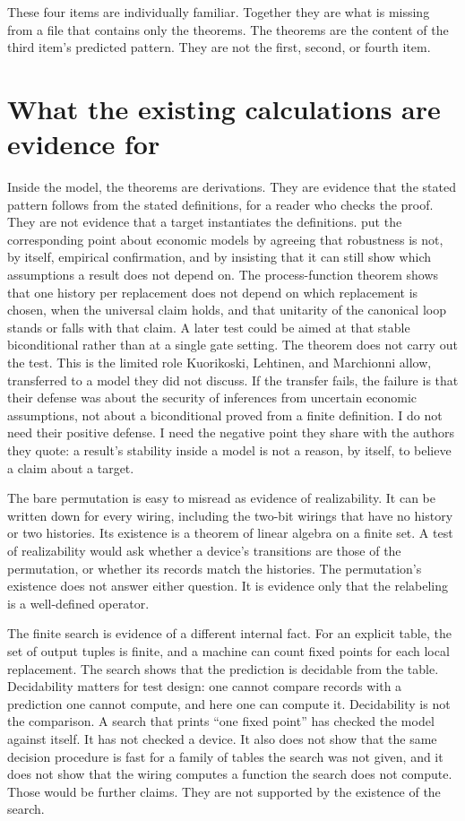 \documentclass[11pt]{article}
\begin{document}
These four items are individually familiar. Together they are what is missing from a file that contains only the theorems. The theorems are the content of the third item's predicted pattern. They are not the first, second, or fourth item.

\section{What the existing calculations are evidence for}
\label{sec:calc}

Inside the model, the theorems are derivations. They are evidence that the stated pattern follows from the stated definitions, for a reader who checks the proof. They are not evidence that a target instantiates the definitions. \citet{kuorikoski2007} put the corresponding point about economic models by agreeing that robustness is not, by itself, empirical confirmation, and by insisting that it can still show which assumptions a result does not depend on. The process-function theorem shows that one history per replacement does not depend on which replacement is chosen, when the universal claim holds, and that unitarity of the canonical loop stands or falls with that claim. A later test could be aimed at that stable biconditional rather than at a single gate setting. The theorem does not carry out the test. This is the limited role Kuorikoski, Lehtinen, and Marchionni allow, transferred to a model they did not discuss. If the transfer fails, the failure is that their defense was about the security of inferences from uncertain economic assumptions, not about a biconditional proved from a finite definition. I do not need their positive defense. I need the negative point they share with the authors they quote: a result's stability inside a model is not a reason, by itself, to believe a claim about a target.

The bare permutation is easy to misread as evidence of realizability. It can be written down for every wiring, including the two-bit wirings that have no history or two histories. Its existence is a theorem of linear algebra on a finite set. A test of realizability would ask whether a device's transitions are those of the permutation, or whether its records match the histories. The permutation's existence does not answer either question. It is evidence only that the relabeling is a well-defined operator.

The finite search is evidence of a different internal fact. For an explicit table, the set of output tuples is finite, and a machine can count fixed points for each local replacement. The search shows that the prediction is decidable from the table. Decidability matters for test design: one cannot compare records with a prediction one cannot compute, and here one can compute it. Decidability is not the comparison. A search that prints ``one fixed point'' has checked the model against itself. It has not checked a device. It also does not show that the same decision procedure is fast for a family of tables the search was not given, and it does not show that the wiring computes a function the search does not compute. Those would be further claims. They are not supported by the existence of the search.
\end{document}
